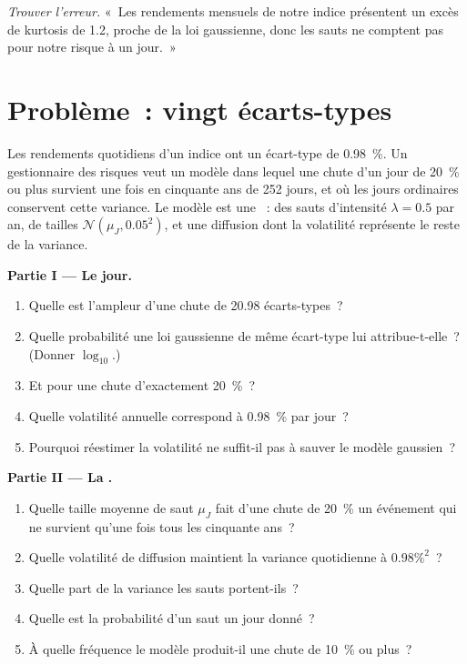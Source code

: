 \begin{exercise}[$\star\star\star$]\label{exo:qm:jump-processes:8}
\emph{Trouver l'erreur.} «~Les rendements mensuels de notre indice présentent un excès de kurtosis de 1.2, proche de la loi gaussienne,
donc les sauts ne comptent pas pour notre risque à un jour.~»
\end{exercise}

\section{Problème~: vingt écarts-types}

\begin{problem}\label{pb:qm:jump-processes:1}
Les rendements quotidiens d'un indice ont un écart-type de 0.98~\%. Un gestionnaire des risques veut un modèle dans lequel une
chute d'un jour de 20~\% ou plus survient une fois en cinquante ans de 252 jours, et où les jours ordinaires conservent cette
variance. Le modèle est une ~: des sauts d'intensité $\lambda = 0.5$ par an, de tailles $\mathcal N(\mu_J,
0.05^2)$, et une diffusion dont la volatilité représente le reste de la variance.

\medskip\noindent\textbf{Partie I --- Le jour.}
\begin{enumerate}
\item Quelle est l'ampleur d'une chute de 20.98 écarts-types~?
\item Quelle probabilité une loi gaussienne de même écart-type lui attribue-t-elle~? (Donner $\log_{10}$.)
\item Et pour une chute d'exactement 20~\%~?
\item Quelle volatilité annuelle correspond à 0.98~\% par jour~?
\item Pourquoi réestimer la volatilité ne suffit-il pas à sauver le modèle gaussien~?
\end{enumerate}

\medskip\noindent\textbf{Partie II --- La .}
\begin{enumerate}[resume]
\item Quelle taille moyenne de saut $\mu_J$ fait d'une chute de 20~\% un événement qui ne survient qu'une fois tous les cinquante ans~?
\item Quelle volatilité de diffusion maintient la variance quotidienne à $0.98\%^2$~?
\item Quelle part de la variance les sauts portent-ils~?
\item Quelle est la probabilité d'un saut un jour donné~?
\item À quelle fréquence le modèle produit-il une chute de 10~\% ou plus~?
\end{enumerate}


\end{problem}
